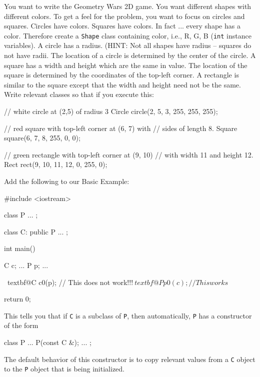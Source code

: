 \begin{ex}
You want to write the Geometry Wars 2D game. You want
different shapes with different colors. To get a feel for the problem,
you want to focus on circles and squares. Circles have colors. Squares
have colors. In fact ... every shape has a color. Therefore create
a \verb!Shape! class containing color, i.e., R, G, B (\verb!int! instance variables). A circle has a radius. (HINT: Not all shapes have radius -- squares do not have radii. The location of a circle is determined by the center of the circle. A square has a width and height which are the same in value. The location of the square is determined by the coordinates of the top-left corner. A rectangle is similar to the square except that the width and height need not be the same. Write relevant classes so that if you execute this:
\begin{console}
// white circle at (2,5) of radius 3
Circle circle(2, 5, 3, 255, 255, 255);

// red square with top-left corner at (6, 7) with
// sides of length 8.
Square square(6, 7, 8, 255, 0, 0);

// green rectangle with top-left corner at (9, 10)
// with width 11 and height 12.
Rect rect(9, 10, 11, 12, 0, 255, 0);
\end{console}
\end{ex}
\newpage{}

Add the following to our Basic Example:
\begin{console}[commandchars=\~\@\$]
#include <iostream>

class P
{     
      ...
};

class C: public P
{
        ...
};

int main()
{   
    C c;
    ...
    P p;
    ...
    
    ~textbf@C c0(p); // This does not work!!!$
    ~textbf@P p0(c); // This works$

    return 0;
}
\end{console}

This tells you that if \verb!C! is a subclass of \verb!P!, then automatically, \verb!P! has a constructor of the form
\begin{console}
class P
{     
      ...
      P(const C &);
      ...
};
\end{console}

The default behavior of this constructor is to copy relevant values from
a \verb!C! object to the \verb!P! object that is being initialized.

